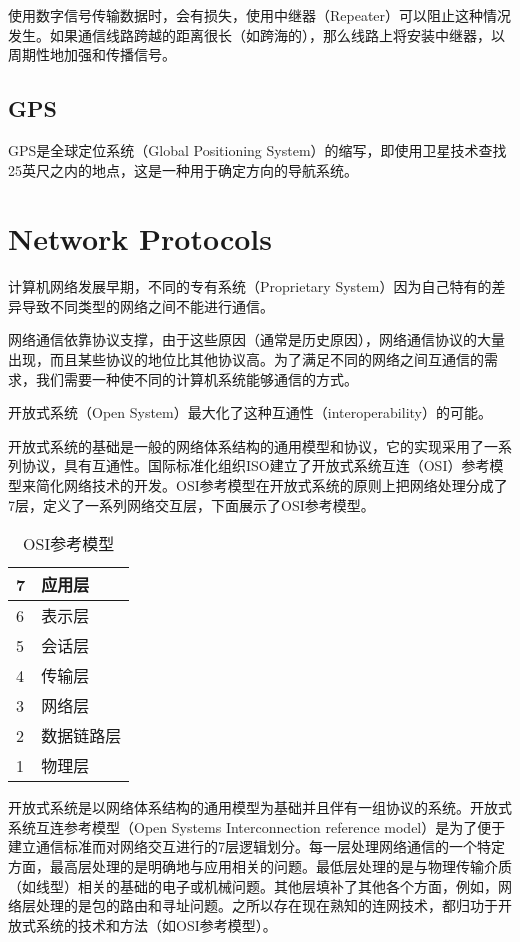 使用数字信号传输数据时，会有损失，使用中继器（Repeater）可以阻止这种情况发生。如果通信线路跨越的距离很长（如跨海的），那么线路上将安装中继器，以周期性地加强和传播信号。


\section{GPS}


GPS是全球定位系统（Global Positioning System）的缩写，即使用卫星技术查找25英尺之内的地点，这是一种用于确定方向的导航系统。


\chapter{Network Protocols}

计算机网络发展早期，不同的专有系统（Proprietary System）因为自己特有的差异导致不同类型的网络之间不能进行通信。

网络通信依靠协议支撑，由于这些原因（通常是历史原因），网络通信协议的大量出现，而且某些协议的地位比其他协议高。为了满足不同的网络之间互通信的需求，我们需要一种使不同的计算机系统能够通信的方式。


开放式系统（Open System）最大化了这种互通性（interoperability）的可能。


开放式系统的基础是一般的网络体系结构的通用模型和协议，它的实现采用了一系列协议，具有互通性。国际标准化组织ISO建立了开放式系统互连（OSI）参考模型来简化网络技术的开发。OSI参考模型在开放式系统的原则上把网络处理分成了7层，定义了一系列网络交互层，下面展示了OSI参考模型。

\begin{table}[!h]
\centering
\caption{OSI参考模型}
\label{Open_Systems_Interconnection_reference_model}
\begin{tabular}{|p{15pt}|p{80pt}|}
\hline
7	&应用层\\
\hline
6	&表示层\\
\hline
5	&会话层\\
\hline
4	&传输层\\
\hline
3	&网络层\\
\hline
2	&数据链路层\\
\hline
1	&物理层\\
\hline


\end{tabular}
\end{table}

开放式系统是以网络体系结构的通用模型为基础并且伴有一组协议的系统。开放式系统互连参考模型（Open Systems Interconnection reference model）是为了便于建立通信标准而对网络交互进行的7层逻辑划分。每一层处理网络通信的一个特定方面，最高层处理的是明确地与应用相关的问题。最低层处理的是与物理传输介质（如线型）相关的基础的电子或机械问题。其他层填补了其他各个方面，例如，网络层处理的是包的路由和寻址问题。之所以存在现在熟知的连网技术，都归功于开放式系统的技术和方法（如OSI参考模型）。






